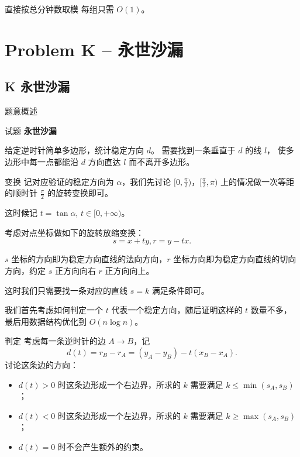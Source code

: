 \documentclass{beamer}
\newcommand{\TT}[1]{{\ttfamily #1}}
\newcommand{\BF}[1]{\textbf{#1}}
\begin{document}
{{\begin{frame}{直接按总分钟数取模}
  \vspace{1em}
  每组只需 $O(1)$。
\end{frame}}

{
\section[K]{Problem K -- 永世沙漏}
\subsection{K 永世沙漏}
\begin{frame}{题意概述}
  \begin{center}试题 \myboxxi{\BF{\TT{K}}} \BF{永世沙漏}\end{center}
  给定逆时针简单多边形，统计稳定方向 $d$。
  需要找到一条垂直于 $d$ 的线 $l$，
  使多边形中每一点都能沿 $d$ 方向直达 $l$ 而不离开多边形。
\end{frame}


\begin{frame}{变换}
  记对应验证的稳定方向为 $\alpha$，我们先讨论 $[0,\frac{\pi}{2})$，$[\frac{\pi}{2},\pi)$ 上的情况做一次等距的顺时针 $\frac{\pi}{2}$ 的旋转变换即可。

  这时候记 $t = \tan \alpha$, $t \in[0, +\infty)$。

  考虑对点坐标做如下的旋转放缩变换：
  \[
    s = x +ty, r = y - tx.
  \]

  $s$ 坐标的方向即为稳定方向直线的法向方向，$r$ 坐标方向即为稳定方向直线的切向方向，约定 $s$ 正方向向右 $r$ 正方向向上。

  这时我们只需要找一条对应的直线 $s = k$ 满足条件即可。

  我们首先考虑如何判定一个 $t$ 代表一个稳定方向，随后证明这样的 $t$ 数量不多，最后用数据结构优化到 $O(n \log n)$。
\end{frame}

\begin{frame}{判定}
  考虑每一条逆时针的边 $A \rightarrow B$，记
  \[d(t) = r_B - r_A = (y_A - y_B) - t(x_B - x_A).\]
  讨论这条边的方向：
  \begin{itemize}
    \item $d(t) > 0$ 时这条边形成一个右边界，所求的 $k$ 需要满足 $k \le \min(s_A, s_B)$；
    \item $d(t) < 0$ 时这条边形成一个左边界，所求的 $k$ 需要满足 $k \ge \max(s_A, s_B)$；
    \item $d(t) = 0$ 时不会产生额外的约束。
  \end{itemize}


\end{frame}}}
\end{document}
